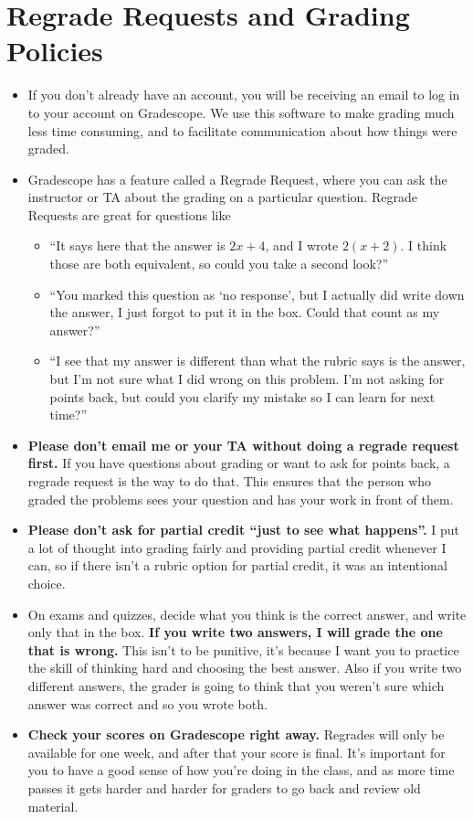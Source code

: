 \documentclass[11pt,letterpaper]{article}
\begin{document}
\section*{Regrade Requests and Grading Policies}
\begin{itemize}[nosep]
\item If you don’t already have an account, you will be receiving an email to log in to your account on Gradescope. We use this software to make grading much less time consuming, and to facilitate communication about how things were graded. 
\item Gradescope has a feature called a Regrade Request, where you can ask the instructor or TA about the grading on a particular question. Regrade Requests are great for questions like
  \begin{itemize}[nosep, label={$\circ$}]
  \item “It says here that the answer is $2x+4$, and I wrote $2(x+2)$. I think those are both equivalent, so could you take a second look?”
  \item “You marked this question as ‘no response’, but I actually did write down the answer, I just forgot to put it in the box. Could that count as my answer?”
  \item “I see that my answer is different than what the rubric says is the answer, but I’m not sure what I did wrong on this problem. I’m not asking for points back, but could you clarify my mistake so I can learn for next time?”
  \end{itemize}
\item \textbf{Please don’t email me or your TA without doing a regrade request first.} If you have questions about grading or want to ask for points back, a regrade request is the way to do that. This ensures that the person who graded the problems sees your question and has your work in front of them.
\item \textbf{Please don’t ask for partial credit “just to see what happens”.} I put a lot of thought into grading fairly and providing partial credit whenever I can, so if there isn’t a rubric option for partial credit, it was an intentional choice. 
\item On exams and quizzes, decide what you think is the correct answer, and write only that in the box. \textbf{If you write two answers, I will grade the one that is wrong.} This isn’t to be punitive, it’s because I want you to practice the skill of thinking hard and choosing the best answer. Also if you write two different answers, the grader is going to think that you weren’t sure which answer was correct and so you wrote both. 
\item \textbf{Check your scores on Gradescope right away.} Regrades will only be available for one week, and after that your score is final. It's important for you to have a good sense of how you're doing in the class, and as more time passes it gets harder and harder for graders to go back and review old material. 
\end{itemize}
\end{document}
